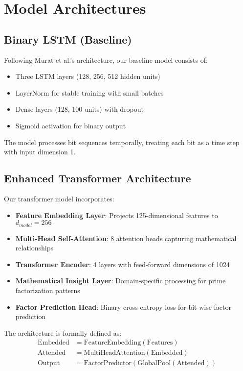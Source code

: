 \documentclass[12pt]{article}
\begin{document}
\section{Model Architectures}

\subsection{Binary LSTM (Baseline)}

Following Murat et al.'s architecture, our baseline model consists of:
\begin{itemize}
\item Three LSTM layers (128, 256, 512 hidden units)
\item LayerNorm for stable training with small batches
\item Dense layers (128, 100 units) with dropout
\item Sigmoid activation for binary output
\end{itemize}

The model processes bit sequences temporally, treating each bit as a time step with input dimension 1.

\subsection{Enhanced Transformer Architecture}

Our transformer model incorporates:
\begin{itemize}
\item \textbf{Feature Embedding Layer}: Projects 125-dimensional features to $d_{model} = 256$
\item \textbf{Multi-Head Self-Attention}: 8 attention heads capturing mathematical relationships
\item \textbf{Transformer Encoder}: 4 layers with feed-forward dimensions of 1024
\item \textbf{Mathematical Insight Layer}: Domain-specific processing for prime factorization patterns
\item \textbf{Factor Prediction Head}: Binary cross-entropy loss for bit-wise factor prediction
\end{itemize}

The architecture is formally defined as:
\begin{align}
\text{Embedded} &= \text{FeatureEmbedding}(\text{Features}) \\
\text{Attended} &= \text{MultiHeadAttention}(\text{Embedded}) \\
\text{Output} &= \text{FactorPredictor}(\text{GlobalPool}(\text{Attended}))
\end{align}
\end{document}
